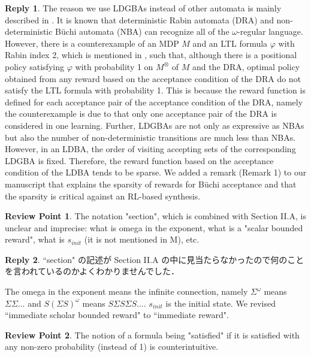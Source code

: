 \documentclass[10 pt, dvipdfmx]{article}
\theoremstyle{definition}
\newtheorem{review point}{Review Point}[section]
\newtheorem*{reply}{Reply}
\begin{document}
\begin{reply}
  The reason we use LDGBAs instead of other automata is mainly described in \cite{Hahn2019}. It is known that deterministic Rabin automata (DRA) and non-deterministic B\"{u}chi automata (NBA) can recognize all of the $\omega$-regular language. However, there is a counterexample of an MDP $M$ and an LTL formula $\varphi$ with Rabin index 2, which is mentioned in \cite{Hahn2019}, such that, although there is a positional policy satisfying $\varphi$ with probability 1 on $M^{\otimes}$ of $M$ and the DRA, optimal policy obtained from any reward based on the acceptance condition of the DRA do not satisfy the LTL formula with probability 1. This is because the reward function is defined for each acceptance pair of the acceptance condition of the DRA, namely the counterexample is due to that only one acceptance pair of the DRA is considered in one learning. Further, LDGBAs are not only as expressive as NBAs but also the number of non-deterministic transitions are much less than NBAs.
  However, in an LDBA, the order of visiting accepting sets of the corresponding LDGBA is fixed. Therefore, the reward function based on the acceptance condition of the LDBA tends to be sparse. We added a remark (Remark 1) to our manuscript that explains the sparsity of rewards for B\"{u}chi acceptance and that the sparsity is critical against an RL-based synthesis.
\end{reply}

\begin{review point}
  The notation "section", which is combined with Section II.A, is
unclear and imprecise: what is omega in the exponent, what is a "scalar
bounded reward", what is $s_{init}$ (it is not mentioned in M), etc.
\end{review point}

\begin{reply}
  ``section" の記述が Section II.A の中に見当たらなかったので何のことを言われているのかよくわかりませんでした．

  The omega in the exponent means the infinite connection, namely $\Sigma^{\omega}$ means $\Sigma \Sigma \ldots$ and $S (\Sigma S)^{\omega}$ means $S \Sigma S \Sigma S \ldots$. $s_{init}$ is the initial state. We revised ``immediate scholar bounded reward" to ``immediate reward".
\end{reply}

\begin{review point}
  The notion of a formula being "satisfied" if it is satisfied with any
non-zero probability (instead of 1) is counterintuitive.
\end{review point}
\end{document}
